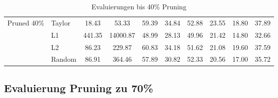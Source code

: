 \begin{table}[h]
{\begin{tabular}{l l | c c | c c c c c | r}
			\multirow{4}{*}{Pruned 40\%} & Taylor          & 18.43              & 53.33
			                             & 59.39           & 34.84              & 52.88
			                             & 23.55           & 18.80              & 37.89            \\

			                             & L1              & 441.35             & 14000.87
			                             & 48.99           & 28.13              & 49.96
			                             & 21.42           & 14.80              & 32.66            \\


			                             & L2              & 86.23              & 229.87
			                             & 60.83           & 34.18              & 51.62
			                             & 21.08           & 19.60              & 37.59            \\


			                             & Random          & 86.91              & 364.46
			                             & 57.89           & 30.82              & 52.33
			                             & 20.56           & 17.00              & 35.72            \\
			\midrule
		\end{tabular}}
	\caption{Evaluierungen bis 40\% Pruning}
	\label{tab:pruning40}
\end{table}

\newpage

\subsection{Evaluierung Pruning zu 70\%}

